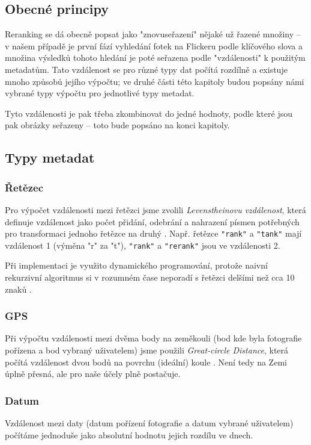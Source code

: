 \documentclass[12pt,oneside,a4paper]{article}
\begin{document}
\subsection{Obecné principy}
Reranking se dá obecně popsat jako "znovuseřazení" nějaké už řazené množiny -- v našem případě je první fází vyhledání fotek na Flickeru podle klíčového slova a množina výsledků tohoto hledání je poté seřazena podle "vzdálenosti" k použitým metadatům. Tato vzdálenost se pro různé typy dat počítá rozdílně a existuje mnoho způsobů jejího výpočtu; ve druhé části této kapitoly budou popsány námi vybrané typy výpočtu pro jednotlivé typy metadat.

Tyto vzdálenosti je pak třeba zkombinovat do jedné hodnoty, podle které jsou pak obrázky seřazeny -- toto bude popsáno na konci kapitoly.

\subsection{Typy metadat}
\subsubsection{Řetězec}
Pro výpočet vzdálenosti mezi řetězci jsme zvolili \textit{Levenstheinovu vzdálenost}, která definuje vzdálenost jako počet přidání, odebrání a nahrazení písmen potřebných pro transformaci jednoho řetězce na druhý \cite{Levensthein}.
Např. řetězce \texttt{"rank"} a \texttt{"tank"} mají vzdálenost 1 (výměna "r" za "t"), \texttt{"rank"} a \texttt{"rerank"} jsou ve vzdálenosti 2.

Při implementaci je využito dynamického programování, protože naivní rekurzivní algoritmus si v rozumném čase neporadí s řetězci delšími než cca 10 znaků \cite{Levensthein_java}.

\subsubsection{GPS}
Při výpočtu vzdálenosti mezi dvěma body na zeměkouli (bod kde byla fotografie pořízena a bod vybraný uživatelem) jsme použili \textit{Great-circle Distance}, která počítá vzdálenost dvou bodů na povrchu (ideální) koule \cite{GCD}. Není tedy na Zemi úplně přesná, ale pro naše účely plně postačuje.

\subsubsection{Datum}
Vzdálenost mezi daty (datum pořízení fotografie a datum vybrané uživatelem) počítáme jednoduše jako absolutní hodnotu jejich rozdílu ve dnech.
\end{document}

